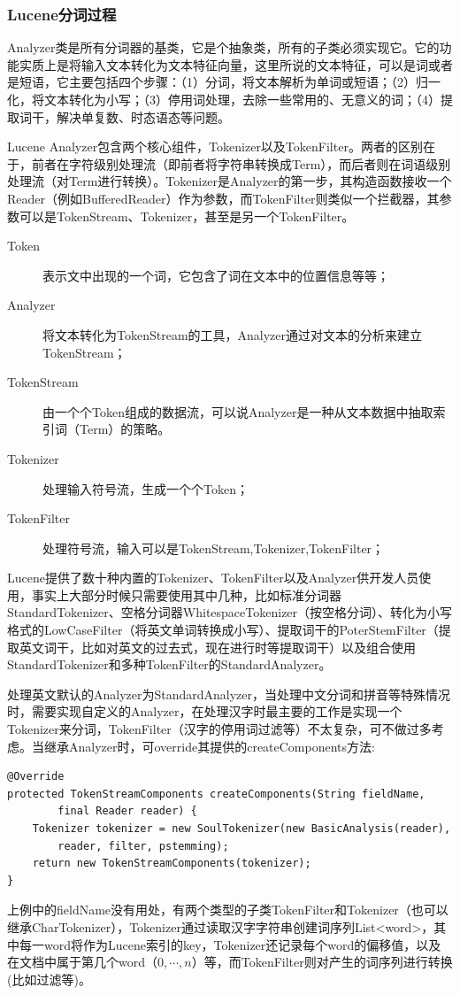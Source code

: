 \subsubsection{Lucene分词过程}
\par Analyzer类是所有分词器的基类，它是个抽象类，所有的子类必须实现它。它的功能实质上是将输入文本转化为文本特征向量，这里所说的文本特征，可以是词或者是短语，它主要包括四个步骤：（1）分词，将文本解析为单词或短语；（2）归一化，将文本转化为小写；（3）停用词处理，去除一些常用的、无意义的词；（4）提取词干，解决单复数、时态语态等问题。
\par Lucene Analyzer包含两个核心组件，Tokenizer以及TokenFilter。两者的区别在于，前者在字符级别处理流（即前者将字符串转换成Term），而后者则在词语级别处理流（对Term进行转换）。Tokenizer是Analyzer的第一步，其构造函数接收一个Reader（例如BufferedReader）作为参数，而TokenFilter则类似一个拦截器，其参数可以是TokenStream、Tokenizer，甚至是另一个TokenFilter。
\begin{description}
\item [Token]表示文中出现的一个词，它包含了词在文本中的位置信息等等；
\item [Analyzer]将文本转化为TokenStream的工具，Analyzer通过对文本的分析来建立TokenStream；
\item [TokenStream]由一个个Token组成的数据流，可以说Analyzer是一种从文本数据中抽取索引词（Term）的策略。
\item [Tokenizer]处理输入符号流，生成一个个Token；
\item [TokenFilter]处理符号流，输入可以是TokenStream,Tokenizer,TokenFilter；
\end{description}
\par Lucene提供了数十种内置的Tokenizer、TokenFilter以及Analyzer供开发人员使用，事实上大部分时候只需要使用其中几种，比如标准分词器StandardTokenizer、空格分词器WhitespaceTokenizer（按空格分词）、转化为小写格式的LowCaseFilter（将英文单词转换成小写）、提取词干的PoterStemFilter（提取英文词干，比如对英文的过去式，现在进行时等提取词干）以及组合使用StandardTokenizer和多种TokenFilter的StandardAnalyzer。 
\par 处理英文默认的Analyzer为StandardAnalyzer，当处理中文分词和拼音等特殊情况时，需要实现自定义的Analyzer，在处理汉字时最主要的工作是实现一个Tokenizer来分词，TokenFilter（汉字的停用词过滤等）不太复杂，可不做过多考虑。当继承Analyzer时，可override其提供的createComponents方法:
\begin{verbatim}
@Override
protected TokenStreamComponents createComponents(String fieldName,
        final Reader reader) {
    Tokenizer tokenizer = new SoulTokenizer(new BasicAnalysis(reader),
        reader, filter, pstemming);
    return new TokenStreamComponents(tokenizer);
}
\end{verbatim}
\par 上例中的fieldName没有用处，有两个类型的子类TokenFilter和Tokenizer（也可以继承CharTokenizer），Tokenizer通过读取汉字字符串创建词序列List<word>，其中每一word将作为Lucene索引的key，Tokenizer还记录每个word的偏移值，以及在文档中属于第几个word（$0,\cdots,n$）等，而TokenFilter则对产生的词序列进行转换(比如过滤等)。 

